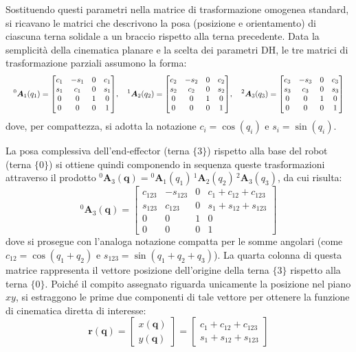 \documentclass[11pt, a4paper]{report}
\begin{document}
Sostituendo questi parametri nella matrice di trasformazione omogenea standard, si ricavano le matrici che descrivono la posa (posizione e orientamento) di ciascuna terna solidale a un braccio rispetto alla terna precedente.
\newpage
Data la semplicità della cinematica planare e la scelta dei parametri DH, le tre matrici di trasformazione parziali assumono la forma:
\[
    \resizebox{\linewidth}{!}{\(\displaystyle
    {}^0\bm{A}_1(q_1) =
    \begin{bmatrix}
        c_1 & -s_1 & 0 & c_1 \\
        s_1 & c_1 & 0 & s_1 \\
        0 & 0 & 1 & 0 \\
        0 & 0 & 0 & 1
    \end{bmatrix} \! , \quad
    {}^1\bm{A}_2(q_2) =
    \begin{bmatrix}
        c_2 & -s_2 & 0 & c_2 \\
        s_2 & c_2 & 0 & s_2 \\
        0 & 0 & 1 & 0 \\
        0 & 0 & 0 & 1
    \end{bmatrix} \! , \quad
    {}^2\bm{A}_3(q_3) =
    \begin{bmatrix}
        c_3 & -s_3 & 0 & c_3 \\
        s_3 & c_3 & 0 & s_3 \\
        0 & 0 & 1 & 0 \\
        0 & 0 & 0 & 1
    \end{bmatrix}
    \)}
\]
dove, per compattezza, si adotta la notazione $c_i = \cos(q_i)$ e $s_i = \sin(q_i)$.

La posa complessiva dell'end-effector (terna $\{3\}$) rispetto alla base del robot (terna $\{0\}$) si ottiene quindi componendo in sequenza queste trasformazioni attraverso il prodotto ${}^0\bm{A}_3(\bm{q}) = {}^0\bm{A}_1(q_1)\,{}^1\bm{A}_2(q_2)\,{}^2\bm{A}_3(q_3)$, da cui risulta:
\[
    {}^0\bm{A}_3(\bm{q}) =
    \begin{bmatrix}
        c_{123} & -s_{123} & 0 & c_1 + c_{12} + c_{123} \\
        s_{123} & c_{123} & 0 & s_1 + s_{12} + s_{123} \\
        0 & 0 & 1 & 0 \\
        0 & 0 & 0 & 1
    \end{bmatrix}
\]
dove si prosegue con l'analoga notazione compatta per le somme angolari (come $c_{12} = \cos(q_1+q_2)$ e $s_{123} = \sin(q_1+q_2+q_3)$). La quarta colonna di questa matrice rappresenta il vettore posizione dell'origine della terna $\{3\}$ rispetto alla terna $\{0\}$. Poiché il compito assegnato riguarda unicamente la posizione nel piano $xy$, si estraggono le prime due componenti di tale vettore per ottenere la funzione di cinematica diretta di interesse:
\[
    \bm{r}(\bm{q}) =
    \begin{bmatrix} x(\bm{q}) \\ y(\bm{q}) \end{bmatrix} =
    \begin{bmatrix}
        c_1 + c_{12} + c_{123} \\
        s_1 + s_{12} + s_{123}
    \end{bmatrix}
\]
\end{document}
